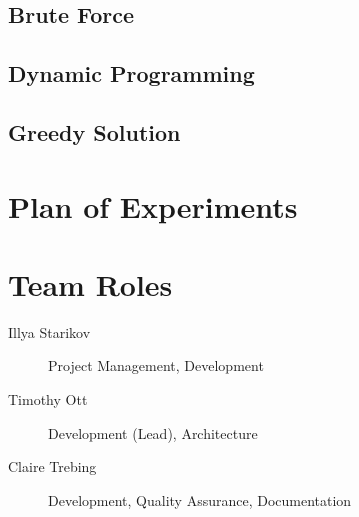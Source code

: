 \documentclass{article}
\begin{document}
\subsection{Brute Force}
\subsection{Dynamic Programming}
\subsection{Greedy Solution}


\section{Plan of Experiments}


\section{Team Roles}
\begin{description}
    \item [Illya Starikov] Project Management, Development
    \item [Timothy Ott] Development (Lead), Architecture
    \item [Claire Trebing] Development, Quality Assurance,  Documentation
\end{description}
\end{document}
